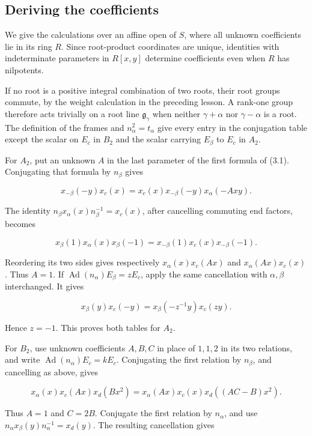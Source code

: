 \documentclass[11pt,a4paper,openany]{report}
\begin{document}
\subsection{Deriving the coefficients}\label{AG-RG-05-deriving-the-coefficients}

We give the calculations over an affine open of \(S\), where all unknown coefficients lie in its ring \(R\). Since root-product coordinates are unique, identities with indeterminate parameters in \(R[x,y]\) determine coefficients even when \(R\) has nilpotents.

If no root is a positive integral combination of two roots, their root groups commute, by the weight calculation in the preceding lesson. A rank-one group therefore acts trivially on a root line \(\mathfrak g_\gamma\) when neither \(\gamma+\alpha\) nor \(\gamma-\alpha\) is a root. The definition of the frames and \(n_\alpha^2=t_\alpha\) give every entry in the conjugation table except the scalar on \(E_c\) in \(B_2\) and the scalar carrying \(E_\beta\) to \(E_c\) in \(A_2\).

For \(A_2\), put an unknown \(A\) in the last parameter of the first formula of (3.1). Conjugating that formula by \(n_\beta\) gives

\[
x_{-\beta}(-y)x_c(x)
=x_c(x)x_{-\beta}(-y)x_\alpha(-Axy).
\]

The identity \(n_\beta x_\alpha(x)n_\beta^{-1}=x_c(x)\), after cancelling commuting end factors, becomes

\[
x_\beta(1)x_\alpha(x)x_\beta(-1)
=x_{-\beta}(1)x_c(x)x_{-\beta}(-1).
\]

Reordering its two sides gives respectively \(x_\alpha(x)x_c(Ax)\) and \(x_\alpha(Ax)x_c(x)\). Thus \(A=1\). If \(\operatorname{Ad}(n_\alpha)E_\beta=zE_c\), apply the same cancellation with \(\alpha,\beta\) interchanged. It gives

\[
x_\beta(y)x_c(-y)=x_\beta(-z^{-1}y)x_c(zy).
\]

Hence \(z=-1\). This proves both tables for \(A_2\).

For \(B_2\), use unknown coefficients \(A,B,C\) in place of \(1,1,2\) in its two relations, and write \(\operatorname{Ad}(n_\alpha)E_c=kE_c\). Conjugating the first relation by \(n_\beta\), and cancelling as above, gives

\[
x_\alpha(x)x_c(Ax)x_d(Bx^2)
=x_\alpha(Ax)x_c(x)x_d((AC-B)x^2).
\]

Thus \(A=1\) and \(C=2B\). Conjugate the first relation by \(n_\alpha\), and use \(n_\alpha x_\beta(y)n_\alpha^{-1}=x_d(y)\). The resulting cancellation gives
\end{document}
